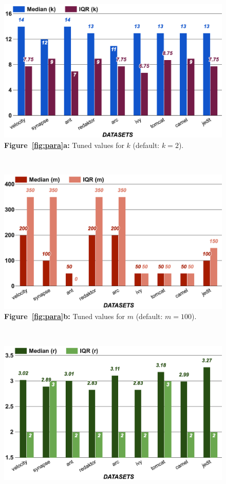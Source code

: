 \documentclass[10pt,conference]{IEEEtran}
\theoremstyle{break}
\theoremstyle{break}
\begin{document}
\begin{figure}[!t]
    \centering
    \begin{minipage}{.3\textwidth}
    \centering
        \includegraphics[width=.95\linewidth]{./fig/k.png}
        {\bf Figure~\ref{fig:para}a:} Tuned values for $k$ (default:  $k=2$).
    \end{minipage}~~%
    \begin{minipage}{.3\textwidth}
    \centering
        \includegraphics[width=.95\linewidth]{./fig/m.png}
        {\bf Figure~\ref{fig:para}b:} Tuned values for $m$ (default: $m=100$).
    \end{minipage}~~%
    \begin{minipage}{.3\textwidth}
    \centering
        \includegraphics[width=.95\linewidth]{./fig/r.png}

\end{minipage}
\end{figure}
\end{document}
